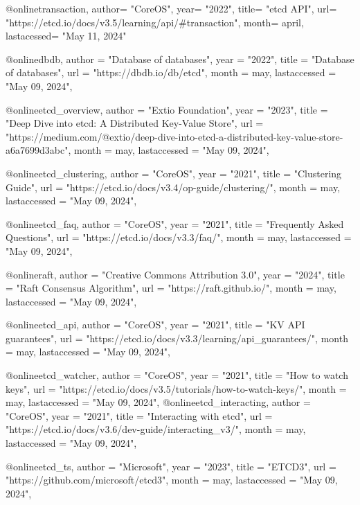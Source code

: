 @online{transaction,
    author=        "CoreOS",
    year=          "2022",
    title=         "etcd API",
    url=           "https://etcd.io/docs/v3.5/learning/api/#transaction",
    month=         april,
    lastacessed=   "May 11, 2024"
}

@online{dbdb,
  author =       "Database of databases",
  year =         "2022",
  title =        "Database of databases",
  url =          "https://dbdb.io/db/etcd",
  month =        may,
  lastaccessed = "May 09, 2024",
}


@online{etcd_overview,
  author =       "Extio Foundation",
  year =         "2023",
  title =        "Deep Dive into etcd: A Distributed Key-Value Store",
  url =          "https://medium.com/@extio/deep-dive-into-etcd-a-distributed-key-value-store-a6a7699d3abc",
  month =        may,
  lastaccessed = "May 09, 2024",
}

@online{etcd_clustering,
  author =       "CoreOS",
  year =         "2021",
  title =        "Clustering Guide",
  url =          "https://etcd.io/docs/v3.4/op-guide/clustering/",
  month =        may,
  lastaccessed = "May 09, 2024",
}

@online{etcd_faq,
  author =       "CoreOS",
  year =         "2021",
  title =        "Frequently Asked Questions",
  url =          "https://etcd.io/docs/v3.3/faq/",
  month =        may,
  lastaccessed = "May 09, 2024",
}

@online{raft,
  author =       "Creative Commons Attribution 3.0",
  year =         "2024",
  title =        "Raft Consensus Algorithm",
  url =          "https://raft.github.io/",
  month =        may,
  lastaccessed = "May 09, 2024",
}

@online{etcd_api,
  author =       "CoreOS",
  year =         "2021",
  title =        "KV API guarantees",
  url =          "https://etcd.io/docs/v3.3/learning/api_guarantees/",
  month =        may,
  lastaccessed = "May 09, 2024",
}


@online{etcd_watcher,
  author =       "CoreOS",
  year =         "2021",
  title =        "How to watch keys",
  url =          "https://etcd.io/docs/v3.5/tutorials/how-to-watch-keys/",
  month =        may,
  lastaccessed = "May 09, 2024",
}
@online{etcd_interacting,
  author =       "CoreOS",
  year =         "2021",
  title =        "Interacting with etcd",
  url =          "https://etcd.io/docs/v3.6/dev-guide/interacting_v3/",
  month =        may,
  lastaccessed = "May 09, 2024",
}

@online{etcd_ts,
  author =       "Microsoft",
  year =         "2023",
  title =        "ETCD3",
  url =          "https://github.com/microsoft/etcd3",
  month =        may,
  lastaccessed = "May 09, 2024",
}

